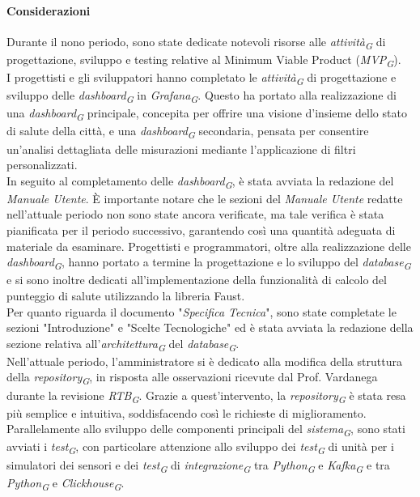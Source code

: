 \paragraph{Considerazioni}
Durante il nono periodo, sono state dedicate notevoli risorse alle \textit{attività}\textsubscript{\textit{G}} di progettazione, sviluppo e testing relative al Minimum Viable Product (\textit{MVP}\textsubscript{\textit{G}}). \\
I progettisti e gli sviluppatori hanno completato le \textit{attività}\textsubscript{\textit{G}} di progettazione e sviluppo delle \textit{dashboard}\textsubscript{\textit{G}} in \textit{Grafana}\textsubscript{\textit{G}}. Questo ha portato alla realizzazione di una \textit{dashboard}\textsubscript{\textit{G}} principale, concepita per offrire una visione d'insieme dello stato di salute della città, e una \textit{dashboard}\textsubscript{\textit{G}} secondaria, pensata per consentire un'analisi dettagliata delle misurazioni mediante l'applicazione di filtri personalizzati. \\
In seguito al completamento delle \textit{dashboard}\textsubscript{\textit{G}}, è stata avviata la redazione del \textit{Manuale Utente}. È importante notare che le sezioni del \textit{Manuale Utente} redatte nell'attuale periodo non sono state ancora verificate, ma tale verifica è stata pianificata per il periodo successivo, garantendo così una quantità adeguata di materiale da esaminare.
Progettisti e programmatori, oltre alla realizzazione delle \textit{dashboard}\textsubscript{\textit{G}}, hanno portato a termine la progettazione e lo sviluppo del \textit{database}\textsubscript{\textit{G}} e si sono inoltre dedicati all'implementazione della funzionalità di calcolo del punteggio di salute utilizzando la libreria Faust. \\
Per quanto riguarda il documento "\textit{Specifica Tecnica}", sono state completate le sezioni "Introduzione" e "Scelte Tecnologiche" ed è stata avviata la redazione della sezione relativa all'\textit{architettura}\textsubscript{\textit{G}} del \textit{database}\textsubscript{\textit{G}}. \\
Nell'attuale periodo, l'amministratore si è dedicato alla modifica della struttura della \textit{repository}\textsubscript{\textit{G}}, in risposta alle osservazioni ricevute dal Prof. Vardanega durante la revisione \textit{RTB}\textsubscript{\textit{G}}. Grazie a quest'intervento, la \textit{repository}\textsubscript{\textit{G}} è stata resa più semplice e intuitiva, soddisfacendo così le richieste di miglioramento. \\
Parallelamente allo sviluppo delle componenti principali del \textit{sistema}\textsubscript{\textit{G}}, sono stati avviati i \textit{test}\textsubscript{\textit{G}}, con particolare attenzione allo sviluppo dei \textit{test}\textsubscript{\textit{G}} di unità per i simulatori dei sensori e dei \textit{test}\textsubscript{\textit{G}} di \textit{integrazione}\textsubscript{\textit{G}} tra \textit{Python}\textsubscript{\textit{G}} e \textit{Kafka}\textsubscript{\textit{G}} e tra \textit{Python}\textsubscript{\textit{G}} e \textit{Clickhouse}\textsubscript{\textit{G}}.

